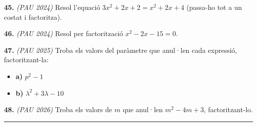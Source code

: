 \documentclass[13pt,a4paper]{extarticle}
\begin{document}
\par\noindent\begin{minipage}{\linewidth}
\textbf{45.} \emph{(PAU 2024)} Resol l'equació $3x^2+2x+2=x^2+2x+4$ (passa-ho tot a un costat i factoritza).\par
\end{minipage}\par\vspace{1.6mm}
\par\noindent\begin{minipage}{\linewidth}
\textbf{46.} \emph{(PAU 2024)} Resol per factorització $x^2-2x-15=0$.\par
\end{minipage}\par\vspace{1.6mm}
\par\noindent\begin{minipage}{\linewidth}
\textbf{47.} \emph{(PAU 2025)} Troba els valors del paràmetre que anul·len cada expressió, factoritzant-la:\par

\begin{itemize}[leftmargin=0pt,itemsep=3pt,topsep=3pt,parsep=0pt,label={}]
\item \textbf{a)} $p^2-1$
\item \textbf{b)} $\lambda^2+3\lambda-10$
\end{itemize}
\end{minipage}\par\vspace{1.6mm}
\par\noindent\begin{minipage}{\linewidth}
\textbf{48.} \emph{(PAU 2026)} Troba els valors de $m$ que anul·len $m^2-4m+3$, factoritzant-lo.\par
\end{minipage}\par\vspace{1.6mm}
\vspace{1mm}\hrule\vspace{3mm}
\end{document}
